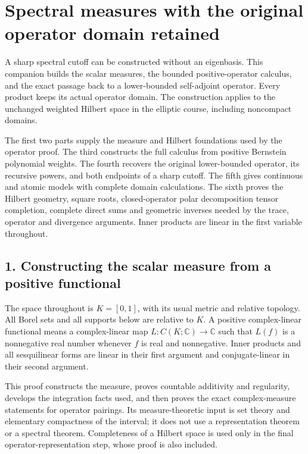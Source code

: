 \documentclass[
  11pt,
]{article}
\author{}
\date{}
\begin{document}
\section{Spectral measures with the original operator domain
retained}\label{spectral-measures-with-the-original-operator-domain-retained}

A sharp spectral cutoff can be constructed without an eigenbasis. This
companion builds the scalar measures, the bounded positive-operator
calculus, and the exact passage back to a lower-bounded self-adjoint
operator. Every product keeps its actual operator domain. The
construction applies to the unchanged weighted Hilbert space in the
elliptic course, including noncompact domains.

The first two parts supply the measure and Hilbert foundations used by
the operator proof. The third constructs the full calculus from positive
Bernstein polynomial weights. The fourth recovers the original
lower-bounded operator, its recursive powers, and both endpoints of a
sharp cutoff. The fifth gives continuous and atomic models with complete
domain calculations. The sixth proves the Hilbert geometry, square
roots, closed-operator polar decomposition tensor completion, complete
direct sums and geometric inverses needed by the trace, operator and
divergence arguments. Inner products are linear in the first variable
throughout.

\subsection{1. Constructing the scalar measure from a positive
functional}\label{constructing-the-scalar-measure-from-a-positive-functional}

The space throughout is \(K=[0,1]\), with its usual metric and relative
topology. All Borel sets and all supports below are relative to \(K\). A
positive complex-linear functional means a complex-linear map
\(L:C(K;\mathbb C)\to\mathbb C\) such that \(L(f)\) is a nonnegative
real number whenever \(f\) is real and nonnegative. Inner products and
all sesquilinear forms are linear in their first argument and
conjugate-linear in their second argument.

This proof constructs the measure, proves countable additivity and
regularity, develops the integration facts used, and then proves the
exact complex-measure statements for operator pairings. Its
measure-theoretic input is set theory and elementary compactness of the
interval; it does not use a representation theorem or a spectral
theorem. Completeness of a Hilbert space is used only in the final
operator-representation step, whose proof is also included.
\end{document}
